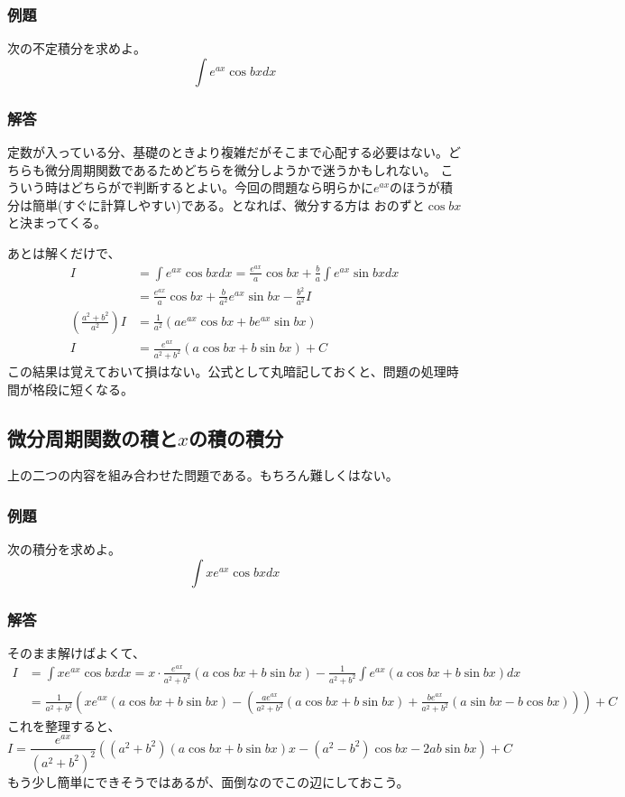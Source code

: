 \documentclass[a4j,dvipdfmx]{jsarticle}
\begin{document}
\subsubsection*{例題}
次の不定積分を求めよ。
\begin{equation*}
    \int e^{ax}\cos bxdx
\end{equation*}
\subsubsection*{解答}
定数が入っている分、基礎のときより複雑だがそこまで心配する必要はない。どちらも微分周期関数であるためどちらを微分しようかで迷うかもしれない。
こういう時はどちらがで判断するとよい。今回の問題なら明らかに$e^{ax}$のほうが積分は簡単(すぐに計算しやすい)である。となれば、微分する方は
おのずと$\cos bx$と決まってくる。

あとは解くだけで、
\begin{align*}
    I&=\int e^{ax}\cos bxdx=\frac{e^{ax}}{a}\cos bx+\frac{b}{a}\int e^{ax}\sin bx dx\\
    &=\frac{e^{ax}}{a}\cos bx+\frac{b}{a^2}e^{ax}\sin bx-\frac{b^2}{a^2}I\\
    (\frac{a^2+b^2}{a^2})I&=\frac{1}{a^2}(ae^{ax}\cos bx+be^{ax}\sin bx)\\
    I&=\frac{e^{ax}}{a^2+b^2}(a\cos bx+b\sin bx)+C
\end{align*}
この結果は覚えておいて損はない。公式として丸暗記しておくと、問題の処理時間が格段に短くなる。

\subsection{微分周期関数の積と$x$の積の積分}
上の二つの内容を組み合わせた問題である。もちろん難しくはない。
\subsubsection*{例題}
次の積分を求めよ。
\begin{equation*}
    \int xe^{ax}\cos bxdx
\end{equation*}
\subsubsection*{解答}
そのまま解けばよくて、
\begin{align*}
    I&=\int xe^{ax}\cos bxdx=x\cdot\frac{e^{ax}}{a^2+b^2}(a\cos bx+b\sin bx)-\frac{1}{a^2+b^2}\int e^{ax}(a\cos bx+b\sin bx)dx\\
    &=\frac{1}{a^2+b^2}(xe^{ax}(a\cos bx+b\sin bx)-\left(\frac{ae^{ax}}{a^2+b^2}(a\cos bx+b\sin bx)+\frac{be^{ax}}{a^2+b^2}(a\sin bx-b\cos bx)\right))+C
\end{align*}
これを整理すると、
\newpage
\begin{equation*}
    I=\frac{e^{ax}}{(a^2+b^2)^2}\left((a^2+b^2)(a\cos bx+b\sin bx)x-(a^2-b^2)\cos bx-2ab\sin bx\right)+C
\end{equation*}
もう少し簡単にできそうではあるが、面倒なのでこの辺にしておこう。
\end{document}
